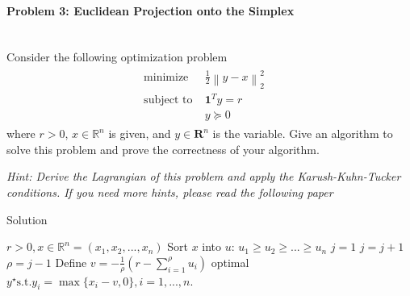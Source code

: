 \documentclass[a4paper]{article}
\begin{document}
\paragraph{Problem 3: Euclidean Projection onto the Simplex}
~\\
Consider the following optimization problem
\begin{gather*}
\begin{matrix}
\text{minimize~~} & \frac{1}{2}\left\|y-x\right\|^2_2\quad\\
\text{subject to} & \mathbf{1}^Ty=r\quad\quad\\
&y\succeq0\quad\quad\quad
\end{matrix}
\end{gather*}
where $r>0$, $x\in \mathbb{R}^n$ is given, and $y\in \mathbf{R}^n$ is the variable. Give an algorithm to solve this problem and prove the correctness of your algorithm.

\noindent\emph{Hint: Derive the Lagrangian of this problem and apply the Karush-Kuhn-Tucker conditions. If you need more hints, please read the following paper \cite{Wang2013}}


\begin{algorithm}
    \caption{Solution}
    \begin{algorithmic}[1]
        \REQUIRE $r>0,x\in \mathbb{R}^n=(x_1, x_2, ...,x_n)$
        \STATE Sort $x$ into $u$: $u_1\geq u_2\geq...\geq u_n$
        \STATE $j=1$
            \STATE $j=j+1$
        \ENDWHILE
        \STATE $\rho = j-1$
        \STATE Define $v=-\frac 1\rho (r-\sum_{i=1}^\rho u_i)$
        \ENSURE optimal $y^\star \text{s.t.} y_i=\max\{x_i-v ,0\}, i=1, ...,n$.
    \end{algorithmic}
\end{algorithm}
\end{document}
